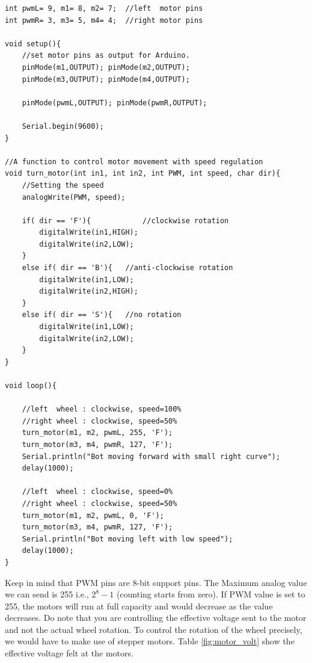\begin{lstlisting}[style=CStyle]
int pwmL= 9, m1= 8, m2= 7;  //left  motor pins
int pwmR= 3, m3= 5, m4= 4;  //right motor pins

void setup(){
    //set motor pins as output for Arduino.
    pinMode(m1,OUTPUT); pinMode(m2,OUTPUT); 
    pinMode(m3,OUTPUT); pinMode(m4,OUTPUT);
    
    pinMode(pwmL,OUTPUT); pinMode(pwmR,OUTPUT);
    
    Serial.begin(9600);
}

//A function to control motor movement with speed regulation
void turn_motor(int in1, int in2, int PWM, int speed, char dir){
    //Setting the speed
    analogWrite(PWM, speed);
    
    if( dir == 'F'){			//clockwise rotation
        digitalWrite(in1,HIGH);
        digitalWrite(in2,LOW);
    }
    else if( dir == 'B'){	//anti-clockwise rotation
        digitalWrite(in1,LOW);
        digitalWrite(in2,HIGH);
    }
    else if( dir == 'S'){	//no rotation
        digitalWrite(in1,LOW);
        digitalWrite(in2,LOW);
    }
}

void loop(){

    //left  wheel : clockwise, speed=100%
    //right wheel : clockwise, speed=50%
    turn_motor(m1, m2, pwmL, 255, 'F');  
    turn_motor(m3, m4, pwmR, 127, 'F');
    Serial.println("Bot moving forward with small right curve");
    delay(1000);
    
    //left  wheel : clockwise, speed=0%
    //right wheel : clockwise, speed=50%
    turn_motor(m1, m2, pwmL, 0, 'F');    
    turn_motor(m3, m4, pwmR, 127, 'F');  
    Serial.println("Bot moving left with low speed");
    delay(1000);
}
\end{lstlisting}

\par Keep in mind that \ac{PWM} pins are 8-bit support pins. The Maximum analog value we can send is 255 i.e., $ 2^8 - 1 $ (counting starts from zero). If \ac{PWM} value is set to 255, the motors will run at full capacity and would decrease as the value decreases. Do note that you are controlling the effective voltage sent to the motor and not the actual wheel rotation. To control the rotation of the wheel precisely, we would have to make use of stepper motors. Table \ref{fig:motor_volt} show the effective voltage felt at the motors. \pagebreak

